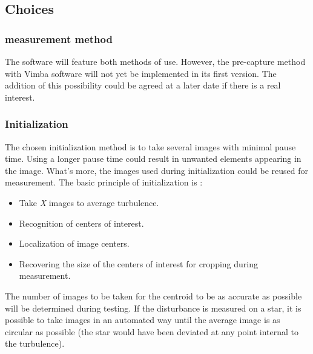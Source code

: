 \subsection{Choices}
\subsubsection{measurement method}
The software will feature both methods of use. However, the pre-capture method with Vimba software will not yet be implemented in its first version. 
The addition of this possibility could be agreed at a later date if there is a real interest.
\subsubsection{Initialization}
The chosen initialization method is to take several images with minimal pause time. \newline
Using a longer pause time could result in unwanted elements appearing in the image. 
What's more, the images used during initialization could be reused for measurement. The basic principle of initialization is : 
\begin{itemize}
    \item Take \textit{X} images to average turbulence.
    \item Recognition of centers of interest.
    \item Localization of image centers.
    \item Recovering the size of the centers of interest for cropping during measurement.
\end{itemize}
The number of images to be taken for the centroid to be as accurate as possible will be determined during testing. 
If the disturbance is measured on a star, it is possible to take images in an automated way until the average image 
is as circular as possible (the star would have been deviated at any point internal to the turbulence).
